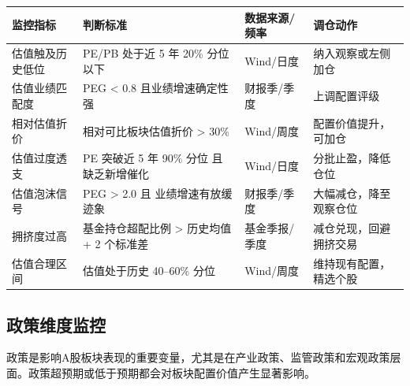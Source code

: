\begin{exhibitbox}[表8-7：估值维度监控指标与触发条件]
\centering
\footnotesize
\setlength{\tabcolsep}{3pt}
\setlength{\aboverulesep}{0pt}
\setlength{\belowrulesep}{0pt}
\begin{tabularx}{\linewidth}{L{2.6cm} L{3.4cm} L{2.4cm} X}
\toprule
\textbf{监控指标} & \textbf{判断标准} & \textbf{数据来源/频率} & \textbf{调仓动作} \\
\midrule
{}
估值触及历史低位 & PE/PB 处于近 5 年 20\% 分位以下 & Wind/日度 & 纳入观察或左侧加仓 \\
估值业绩匹配度 & PEG < 0.8 且业绩增速确定性强 & 财报季/季度 & 上调配置评级 \\
相对估值折价 & 相对可比板块估值折价 > 30\% & Wind/周度 & 配置价值提升，可加仓 \\
\midrule
{}
估值过度透支 & PE 突破近 5 年 90\% 分位 且 缺乏新增催化 & Wind/日度 & 分批止盈，降低仓位 \\
估值泡沫信号 & PEG > 2.0 且 业绩增速有放缓迹象 & 财报季/季度 & 大幅减仓，降至观察仓位 \\
拥挤度过高 & 基金持仓超配比例 > 历史均值 + 2 个标准差 & 基金季报/季度 & 减仓兑现，回避拥挤交易 \\
\midrule
{}
估值合理区间 & 估值处于历史 40--60\% 分位 & Wind/周度 & 维持现有配置，精选个股 \\
\bottomrule
\end{tabularx}
\end{exhibitbox}

\subsection{政策维度监控}

政策是影响A股板块表现的重要变量，尤其是在产业政策、监管政策和宏观政策层面。政策超预期或低于预期都会对板块配置价值产生显著影响。

